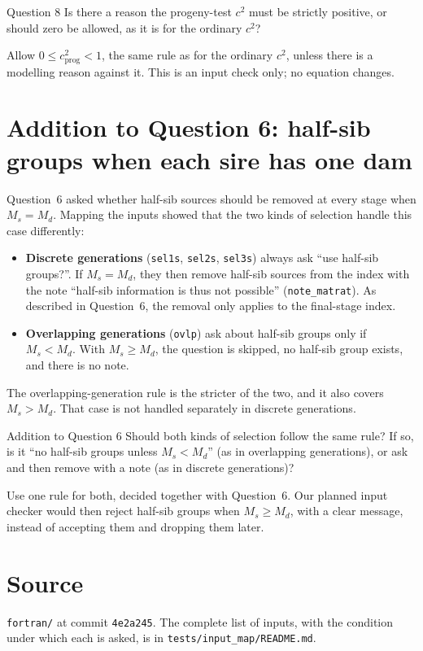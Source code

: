 \documentclass[11pt]{article}
\newcommand{\src}[1]{\texttt{#1}}
\begin{document}
\begin{question}{Question 8}
Is there a reason the progeny-test $c^2$ must be strictly positive, or should zero be allowed, as it is for the ordinary $c^2$?
\end{question}

\begin{recommend}
Allow $0 \le c^2_{\mathrm{prog}} < 1$, the same rule as for the ordinary $c^2$, unless there is a modelling reason against it. This is an input check only; no equation changes.
\end{recommend}

\section{Addition to Question 6: half-sib groups when each sire has one dam}\label{sec:q6}

Question~6 asked whether half-sib sources should be removed at every stage when $M_s = M_d$. Mapping the inputs showed that the two kinds of selection handle this case differently:

\begin{itemize}
\item \textbf{Discrete generations} (\src{sel1s}, \src{sel2s}, \src{sel3s}) always ask ``use half-sib groups?''. If $M_s = M_d$, they then remove half-sib sources from the index with the note ``half-sib information is thus not possible'' (\src{note\_matrat}). As described in Question~6, the removal only applies to the final-stage index.
\item \textbf{Overlapping generations} (\src{ovlp}) ask about half-sib groups only if $M_s < M_d$. With $M_s \ge M_d$, the question is skipped, no half-sib group exists, and there is no note.
\end{itemize}

The overlapping-generation rule is the stricter of the two, and it also covers $M_s > M_d$. That case is not handled separately in discrete generations.

\begin{question}{Addition to Question 6}
Should both kinds of selection follow the same rule? If so, is it ``no half-sib groups unless $M_s < M_d$'' (as in overlapping generations), or ask and then remove with a note (as in discrete generations)?
\end{question}

\begin{recommend}
Use one rule for both, decided together with Question~6. Our planned input checker would then reject half-sib groups when $M_s \ge M_d$, with a clear message, instead of accepting them and dropping them later.
\end{recommend}

\section*{Source}
\src{fortran/} at commit \src{4e2a245}. The complete list of inputs, with the condition under which each is asked, is in \src{tests/input\_map/README.md}.
\end{document}
